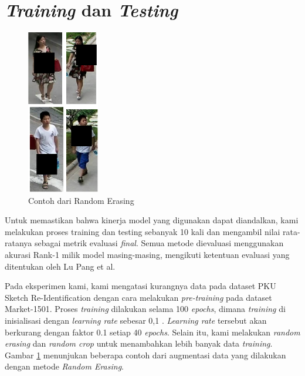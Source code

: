 \section{\textit{Training} dan \textit{Testing}}
\vspace{1ex}

\begin{figure}[h!] \centering
	\includegraphics[width=0.28\textwidth]{img/RandomErasing.png}
	\caption{Contoh dari Random Erasing}
	\label{fig:4}
\end{figure}

Untuk memastikan bahwa kinerja model yang digunakan dapat diandalkan, kami melakukan proses training dan testing sebanyak 10 kali dan mengambil nilai rata-ratanya sebagai metrik evaluasi \textit{final}. Semua metode dievaluasi menggunakan akurasi Rank-1 milik model masing-masing, mengikuti ketentuan evaluasi yang ditentukan oleh Lu Pang et al.

\pagebreak

Pada eksperimen kami, kami mengatasi kurangnya data pada dataset PKU Sketch Re-Identification dengan cara melakukan \textit{pre-training} pada dataset Market-1501. Proses \textit{training} dilakukan selama 100 \textit{epochs}, dimana \textit{training} di inisialisasi dengan \textit{learning rate} sebesar 0,1 . \textit{Learning rate} tersebut akan berkurang dengan faktor  0.1 setiap 40 \textit{epochs}. Selain itu, kami melakukan \textit{random erasing} dan \textit{random crop} untuk menambahkan lebih banyak data \textit{training}. Gambar \ref{fig:4} menunjukan beberapa contoh dari augmentasi data yang dilakukan dengan metode \textit{Random Erasing}.

